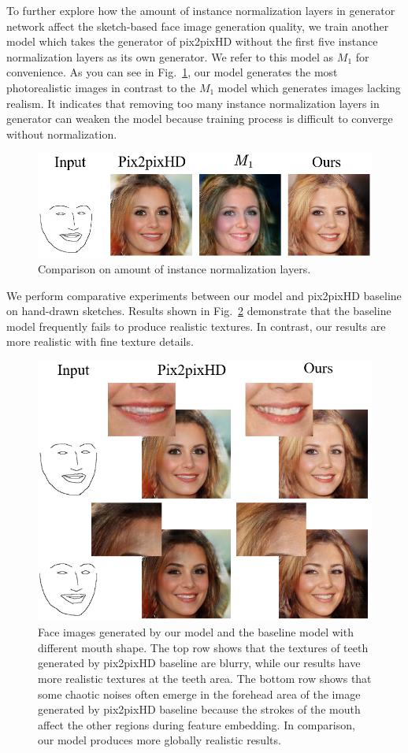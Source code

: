 \documentclass[10pt,twocolumn,letterpaper]{article}
\begin{document}
To further explore how the amount of instance normalization layers in generator network affect the sketch-based face image generation quality, we train another model which takes the generator of pix2pixHD without the first five instance normalization layers as its own generator. We refer to this model as $M_1$ for convenience.
As you can see in Fig.~\ref{fig:ablation}, our model generates the most photorealistic images in contrast to the $M_1$ model which generates images lacking realism. 
It indicates that removing too many instance normalization layers in generator can weaken the model because training process is difficult to converge without normalization.
\begin{figure}[htb]
	\centering
	\includegraphics[width=\columnwidth ]{ablation.png}
	\caption{Comparison on amount of instance normalization layers.}
	\label{fig:ablation}
\end{figure}  

We perform comparative experiments between our model and pix2pixHD baseline on hand-drawn sketches.
Results shown in Fig.~\ref{fig:compare_1} demonstrate that the baseline model frequently fails to produce realistic textures. 
In contrast, our results are more realistic with fine texture details.  
\begin{figure}[htb]
	\centering
	\includegraphics[width=0.45 \textwidth]{texture.png}
	\caption{Face images generated by our model and the baseline model with different mouth shape. The top row shows that the textures of teeth generated by pix2pixHD baseline are blurry, while our results have more realistic textures at the teeth area. The bottom row shows that some chaotic noises often emerge in the forehead area of the image generated by pix2pixHD baseline because the strokes of the mouth affect the other regions during feature embedding. In comparison, our model produces more globally realistic results.}
	\label{fig:compare_1}
\end{figure}
\end{document}
